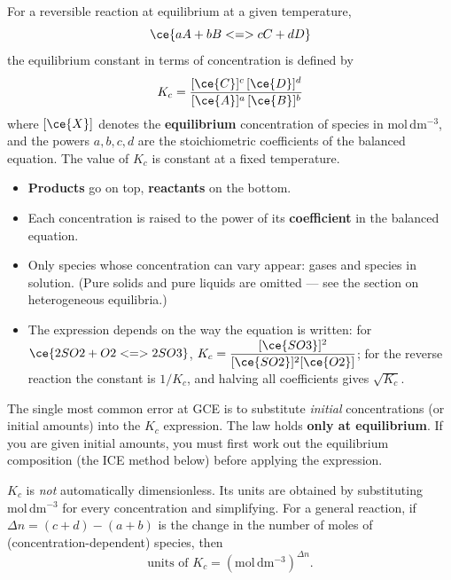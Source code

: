 \documentclass[11pt]{article}
\newcommand{\cle}[1]{{\popxbold\color{popdark}#1}}
\newcounter{popsec}
\newcounter{popsub}
\newcommand{\courssub}[1]{%
  \stepcounter{popsub}%
  \par\vspace{9pt}\noindent{\popxbold\fontsize{11.5}{13}\selectfont\color{popink}{\color{poporange}\thepopsec.\thepopsub}\hspace{6pt}#1}\par\nopagebreak\vspace{4pt}
}
\begin{document}
\begin{definition}
For a reversible reaction at equilibrium at a given temperature,
\[
\ce{aA + bB <=> cC + dD}
\]
the \cle{equilibrium constant} in terms of concentration is defined by
\[
K_c=\frac{[\ce{C}]^c\,[\ce{D}]^d}{[\ce{A}]^a\,[\ce{B}]^b}
\]
where $[\ce{X}]$ denotes the \textbf{equilibrium} concentration of species  in $\mathrm{mol\,dm^{-3}}$, and the powers $a,b,c,d$ are the stoichiometric coefficients of the balanced equation. The value of $K_c$ is constant at a fixed temperature.
\end{definition}

\begin{aretenir}
\begin{itemize}
\item \textbf{Products} go on top, \textbf{reactants} on the bottom.
\item Each concentration is raised to the power of its \textbf{coefficient} in the balanced equation.
\item Only species whose concentration can vary appear: gases and species in solution. (Pure solids and pure liquids are omitted --- see the section on heterogeneous equilibria.)
\item The expression depends on the way the equation is written: for $\ce{2SO2 + O2 <=> 2SO3}$, $K_c=\dfrac{[\ce{SO3}]^2}{[\ce{SO2}]^2[\ce{O2}]}$; for the reverse reaction the constant is $1/K_c$, and halving all coefficients gives $\sqrt{K_c}$.
\end{itemize}
\end{aretenir}

\begin{attention}
The single most common error at GCE is to substitute \emph{initial} concentrations (or initial amounts) into the $K_c$ expression. The law holds \textbf{only at equilibrium}. If you are given initial amounts, you must first work out the equilibrium composition (the ICE method below) before applying the expression.
\end{attention}

\courssub{Units of $K_c$}

$K_c$ is \emph{not} automatically dimensionless. Its units are obtained by substituting $\mathrm{mol\,dm^{-3}}$ for every concentration and simplifying. For a general reaction, if $\Delta n = (c+d)-(a+b)$ is the change in the number of moles of (concentration-dependent) species, then
\[
\text{units of }K_c = \left(\mathrm{mol\,dm^{-3}}\right)^{\Delta n}.
\]
\end{document}
